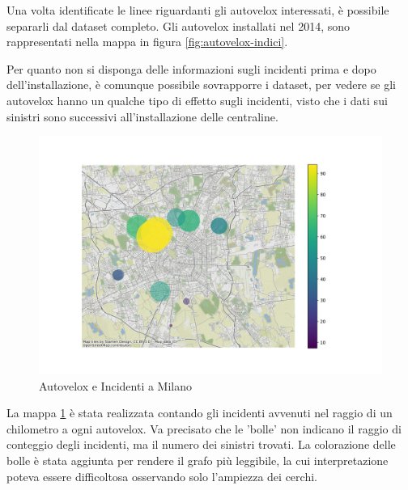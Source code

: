 \documentclass[a4paper]{report}
\begin{document}
Una volta identificate le linee riguardanti gli autovelox interessati, è possibile separarli 
dal dataset completo.
Gli autovelox installati nel 2014, sono rappresentati nella mappa in 
figura \ref{fig:autovelox-indici}.

Per quanto non si disponga delle informazioni sugli incidenti prima e dopo dell'installazione, 
è comunque possibile sovrapporre i dataset, per vedere se gli autovelox hanno un qualche tipo di 
effetto sugli incidenti, visto che i dati sui sinistri sono successivi all'installazione delle centraline.

\begin{figure}
    \includegraphics[width=\linewidth]{../src/autovelox/correlazione.png}
    \caption{Autovelox e Incidenti a Milano}
    \label{fig:autovelox-incidenti}
\end{figure}

La mappa \ref{fig:autovelox-incidenti} è stata realizzata contando gli incidenti avvenuti 
nel raggio di un chilometro a ogni autovelox.
Va precisato che le 'bolle' non indicano il raggio di conteggio degli incidenti, ma 
il numero dei sinistri trovati. La colorazione delle bolle è stata aggiunta per rendere il 
grafo più leggibile, la cui interpretazione poteva essere difficoltosa osservando solo l'ampiezza 
dei cerchi.
\end{document}
